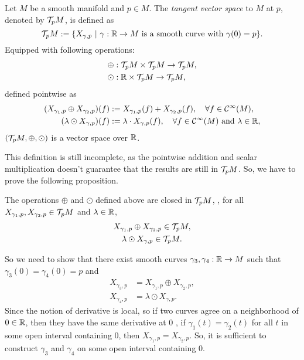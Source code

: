 \begin{definition}
    Let \(M\) be a smooth manifold and \(p \in M\). The \emph{tangent vector space} to \(M\) at \(p\), denoted by \(\mathcal T_p M\), is defined as
    \begin{equation}
        \mathcal T_p M := \qty{X_{\gamma, p} \ \middle|\ \gamma: \mathbb R\to M \text{ is a smooth curve with } \gamma(0) = p}.
    \end{equation}
    Equipped with following operations:
    \begin{align*}
         & \oplus: \mathcal T_p M \times \mathcal T_p M \to \mathcal T_p M, \\
         & \odot:  \mathbb R \times \mathcal T_p M \to \mathcal T_p M,
    \end{align*}
    defined pointwise as
    \begin{align*}
        (X_{\gamma_1, p} \oplus X_{\gamma_2, p})(f) & := X_{\gamma_1, p}(f) + X_{\gamma_2, p}(f), \quad \forall f \in \mathcal C^\infty(M),                    \\
        (\lambda \odot X_{\gamma, p})(f)            & := \lambda \cdot X_{\gamma, p}(f), \quad \forall f \in \mathcal C^\infty(M) \text{ and } \lambda \in \mathbb R,
    \end{align*}
    \(\qty(\mathcal T_p M, \oplus, \odot)\) is a vector space over \(\mathbb R\).
\end{definition}
This definition is still incomplete, as the pointwise addition and scalar multiplication doesn't guarantee that the results are still in \(\mathcal T_p M\). So, we have to prove the following proposition.
\begin{proposition}
    The operations \(\oplus\) and \(\odot\) defined above are closed in \(\mathcal T_p M\), \ie, for all \(X_{\gamma_1, p}, X_{\gamma_2, p} \in \mathcal T_p M\) and \(\lambda \in \mathbb R\),
    \begin{gather}
        X_{\gamma_1, p} \oplus X_{\gamma_2, p} \in \mathcal T_p M, \\
        \lambda \odot X_{\gamma, p}            \in \mathcal T_p M.
    \end{gather}
\end{proposition}
So we need to show that there exist smooth curves \(\gamma_3, \gamma_4: \mathbb R \to M\) such that \(\gamma_3(0) = \gamma_4(0) = p\) and
\begin{align*}
    X_{\gamma_3, p} & = X_{\gamma_1, p} \oplus X_{\gamma_2, p}, \\
    X_{\gamma_4, p} & = \lambda \odot X_{\gamma, p}.
\end{align*}
Since the notion of derivative is local, so if two curves agree on a neighborhood of \(0 \in \mathbb R\), then they have the same derivative at \(0\) \ie, if \(\gamma_1(t) = \gamma_2(t)\) for all \(t\) in some open interval containing \(0\), then \(X_{\gamma_1, p} = X_{\gamma_2, p}\). So, it is sufficient to construct \(\gamma_3\) and \(\gamma_4\) on some open interval containing \(0\).
